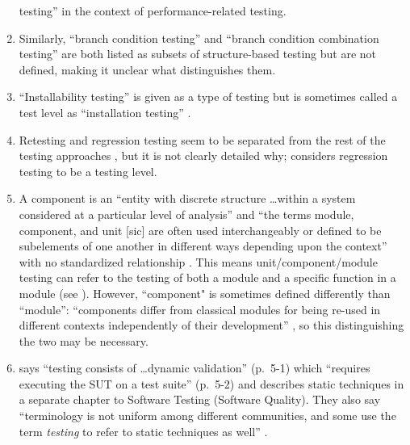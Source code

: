 \begin{enumerate}
            testing'' in the context of performance-related testing.
      \item Similarly, ``branch condition testing'' and ``branch condition combination
            testing'' are both listed as subsets of structure-based testing
            \cite[p.~22]{IEEE2022} but are not defined, making it unclear what
            distinguishes them.
      \item ``Installability testing'' is given as a type of testing
            \cite[p.~22]{IEEE2022} but is sometimes called a test level as
            ``installation testing'' \cite[p.~445]{PetersAndPedrycz2000}.
      \item Retesting and regression testing seem to be separated from the rest
            of the testing approaches \cite[p.~23]{IEEE2022}, but it is not
            clearly detailed why; \citet[p.~3]{BarbosaEtAl2006} considers
            regression testing to be a testing level.
      \item A component is an ``entity with discrete structure \dots within a
            system considered at a particular level of analysis''
            \citep{ISO_IEC2023b} and ``the terms module, component, and unit
                  [sic] are often used interchangeably or defined to be subelements
            of one another in different ways depending upon the context'' with
            no standardized relationship \citep[p.~82]{IEEE2017}. This means
            unit/component/module testing can refer to the testing of both a
            module and a specific function in a module (see ).
            However, ``component" is sometimes defined differently than
            ``module'': ``components differ from classical modules for being
            re-used in different contexts independently of their development''
            \citep[p.~107]{BaresiAndPezzè2006}, so this distinguishing the two
            may be necessary.
      \item \citet{SWEBOK2024} says ``testing consists of \dots dynamic
            validation'' (p.~5-1) which ``requires executing the SUT on a test
            suite''  (p.~5-2) and describes static techniques in
            a separate chapter to Software Testing (Software Quality). They
            also say ``terminology is not uniform among different communities,
            and some use the term \emph{testing} to refer to static techniques
            as well'' \citep[p.~5-2]{SWEBOK2024}.
\end{enumerate}

